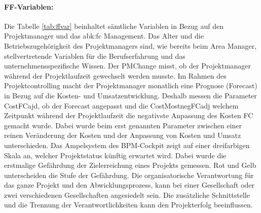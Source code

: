 \paragraph{FF-Variablen:}  Die Tabelle \ref{tab:ffvar} beinhaltet sämtliche  Variablen in Bezug auf den Projektmanager und das \gls{abk:fc} Management. Das Alter und die Betriebszugehörigkeit des Projektmanagers sind, wie bereits beim Area Manager, stellvertretende Variablen für die Berufserfahrung und das unternehmensspezifische Wissen. Der PMChange misst, ob der Projektmanager während der Projektlaufzeit gewechselt werden musste.
\newline Im Rahmen des Projektcontrolling macht der Projektmanager monatlich eine Prognose (Forecast) in Bezug auf die Kosten- und Umsatzentwicklung. Deshalb messen die Parameter CostFCajd, ob der Forecast angepasst und die CostMostnegFCadj welchem Zeitpunkt während der Projektlaufzeit die negativste Anpassung des Kosten FC gemacht wurde. Dabei wurde beim erst genannten Parameter zwischen einer reinen Veränderung der Kosten und der Anpassung von Kosten und Umsatz unterschieden. Das Ampelsystem des BPM-Cockpit zeigt auf einer dreifarbigen Skala an, welcher Projektstatus künftig erwartet wird. Dabei wurde die erstmalige Gefährdung der Zielerreichung eines Projekts gemessen. Rot und Gelb unterscheiden die Stufe der Gefährdung. Die organisatorische Verantwortung für das ganze Projekt und den Abwicklungsprozess, kann bei einer Gesellschaft oder zwei verschiedenen Gesellschaften angesiedelt sein. Die zusätzliche Schnittstelle und die Trennung der Verantwortlichkeiten kann den Projekterfolg beeinflussen.
